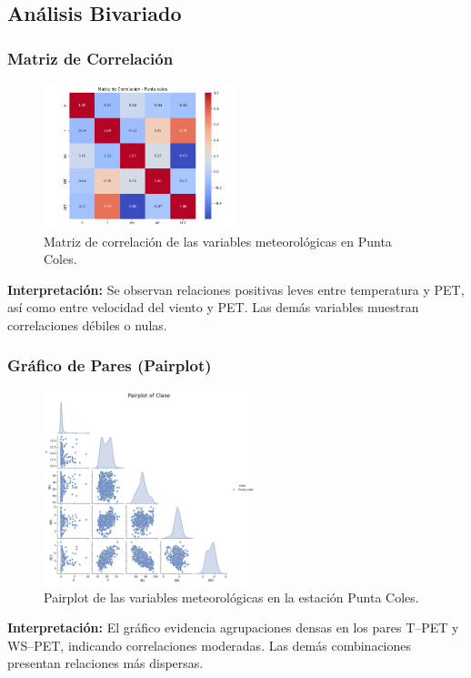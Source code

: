 \subsection{Análisis Bivariado}

\subsubsection*{Matriz de Correlación}
\begin{figure}[H]
\centering
\includegraphics[width=0.5\textwidth]{resultados/por_estacion_meteorologica/Punta_Coles/matriz_correlacion.png}
\caption{Matriz de correlación de las variables meteorológicas en Punta Coles.}
\label{fig:punta_coles_corr}
\end{figure}
\textbf{Interpretación:} Se observan relaciones positivas leves entre temperatura y PET, así como entre velocidad del viento y PET. Las demás variables muestran correlaciones débiles o nulas.

\subsubsection*{Gráfico de Pares (Pairplot)}
\begin{figure}[H]
\centering
\includegraphics[width=0.55\textwidth]{resultados/por_estacion_meteorologica/Punta_Coles/pairplot.png}
\caption{Pairplot de las variables meteorológicas en la estación Punta Coles.}
\label{fig:punta_coles_pairplot}
\end{figure}
\textbf{Interpretación:} El gráfico evidencia agrupaciones densas en los pares T–PET y WS–PET, indicando correlaciones moderadas. Las demás combinaciones presentan relaciones más dispersas.


